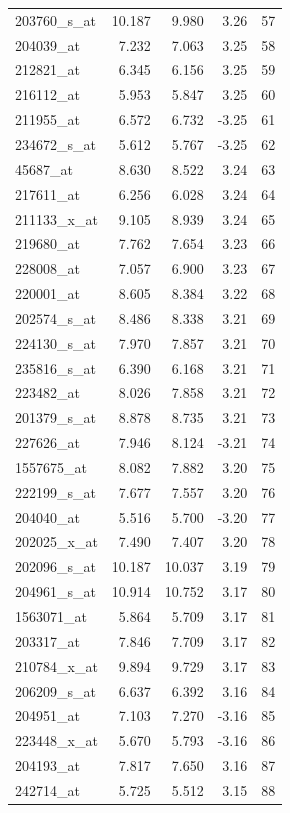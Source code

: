 \begin{footnotesize}
\begin{longtable}{lrrrr}
203760\_s\_at & 10.187 & 9.980 & 3.26 & 57 \\
204039\_at & 7.232 & 7.063 & 3.25 & 58 \\
212821\_at & 6.345 & 6.156 & 3.25 & 59 \\
216112\_at & 5.953 & 5.847 & 3.25 & 60 \\
211955\_at & 6.572 & 6.732 & -3.25 & 61 \\
234672\_s\_at & 5.612 & 5.767 & -3.25 & 62 \\
45687\_at & 8.630 & 8.522 & 3.24 & 63 \\
217611\_at & 6.256 & 6.028 & 3.24 & 64 \\
211133\_x\_at & 9.105 & 8.939 & 3.24 & 65 \\
219680\_at & 7.762 & 7.654 & 3.23 & 66 \\
228008\_at & 7.057 & 6.900 & 3.23 & 67 \\
220001\_at & 8.605 & 8.384 & 3.22 & 68 \\
202574\_s\_at & 8.486 & 8.338 & 3.21 & 69 \\
224130\_s\_at & 7.970 & 7.857 & 3.21 & 70 \\
235816\_s\_at & 6.390 & 6.168 & 3.21 & 71 \\
223482\_at & 8.026 & 7.858 & 3.21 & 72 \\
201379\_s\_at & 8.878 & 8.735 & 3.21 & 73 \\
227626\_at & 7.946 & 8.124 & -3.21 & 74 \\
1557675\_at & 8.082 & 7.882 & 3.20 & 75 \\
222199\_s\_at & 7.677 & 7.557 & 3.20 & 76 \\
204040\_at & 5.516 & 5.700 & -3.20 & 77 \\
202025\_x\_at & 7.490 & 7.407 & 3.20 & 78 \\
202096\_s\_at & 10.187 & 10.037 & 3.19 & 79 \\
204961\_s\_at & 10.914 & 10.752 & 3.17 & 80 \\
1563071\_at & 5.864 & 5.709 & 3.17 & 81 \\
203317\_at & 7.846 & 7.709 & 3.17 & 82 \\
210784\_x\_at & 9.894 & 9.729 & 3.17 & 83 \\
206209\_s\_at & 6.637 & 6.392 & 3.16 & 84 \\
204951\_at & 7.103 & 7.270 & -3.16 & 85 \\
223448\_x\_at & 5.670 & 5.793 & -3.16 & 86 \\
204193\_at & 7.817 & 7.650 & 3.16 & 87 \\
242714\_at & 5.725 & 5.512 & 3.15 & 88 \\

\end{longtable}
\end{footnotesize}
